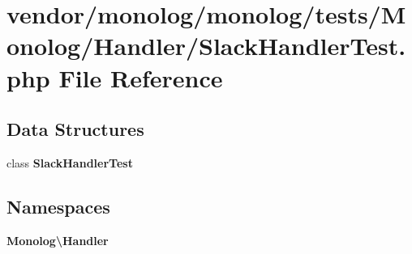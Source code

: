 \section{vendor/monolog/monolog/tests/\+Monolog/\+Handler/\+Slack\+Handler\+Test.php File Reference}
\label{_slack_handler_test_8php}
\subsection*{Data Structures}
\begin{DoxyCompactItemize}
\item 
class {\bf Slack\+Handler\+Test}
\end{DoxyCompactItemize}
\subsection*{Namespaces}
\begin{DoxyCompactItemize}
\item 
 {\bf Monolog\textbackslash{}\+Handler}
\end{DoxyCompactItemize}
